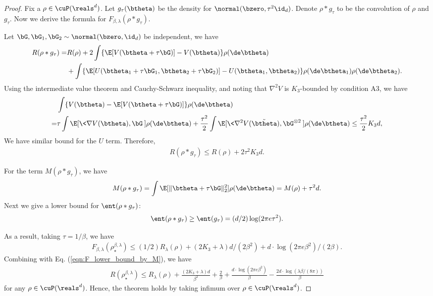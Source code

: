 \documentclass[11pt]{article}
\begin{document}
\begin{proof}

Fix a $\rho \in \cuP(\reals^d)$. Let $g_{\tau}(\btheta)$ be the density for $\normal(\bzero, \tau^2 \id_d)$. Denote $\rho * g_{\tau}$ to be the convolution of $\rho$ and $g_{\tau}$. Now we derive the formula for $F_{\beta, \lambda}(\rho * g_{\tau})$. 


Let $\bG, \bG_1, \bG_2 \sim \normal(\bzero, \id_d)$ be independent, we have
\[
\begin{aligned}
R(\rho * g_{\tau} ) =& R(\rho) + 2 \int \{ \E[V(\btheta + \tau \bG)] - V(\btheta) \} \rho(\de \btheta) \\
&+ \int \{\E[U(\btheta_1 + \tau \bG_1, \btheta_2 + \tau \bG_2)] - U(\btheta_1, \btheta_2)\} \rho(\de \btheta_1) \rho(\de \btheta_2).\\
\end{aligned}
\]
Using the intermediate value theorem and Cauchy-Schwarz inequality, and noting that $\nabla^2 V$ is $K_3$-bounded by condition {\sf A3}, we have
\[
\begin{aligned}
&\int \{V(\btheta) - \E[V(\btheta + \tau\bG)]\} \rho(\de \btheta) \\
=& \tau \int \E[\<\nabla V(\btheta), \bG\> ] \rho( \de \btheta) + \frac{\tau^2}{2} \int \E[\< \nabla^2 V(\tilde \btheta) , \bG^{\otimes 2}\> ] \rho(\de \btheta) \le \frac{\tau^2}{2} K_3 d,
\end{aligned}
\]
We have similar bound for the $U$ term. Therefore, 
\begin{align}
R(\rho * g_{\tau} ) \le R(\rho) + 2\tau^2 K_3 d. 
\end{align}

For the term $M(\rho * g_\tau)$, we have 
\begin{align}
M(\rho * g_\tau) = \int \E[\| \btheta + \tau \bG \|_2^2] \rho(\de \btheta) = M(\rho) + \tau^2 d. 
\end{align}
Next we give a lower bound for $\ent(\rho * g_\tau)$:
\begin{align}
\ent(\rho * g_\tau) \ge \ent(g_\tau) = (d/2) \log(2\pi e \tau^2). 
\end{align}



As a result, taking $\tau = 1/\beta$, we have 
\begin{align}
F_{\beta, \lambda}(\rho_\star^{\beta, \lambda}) \le (1/2) R_\lambda(\rho) + (2 K_3 + \lambda) d/(2\beta^2) + d\cdot \log( 2\pi e \beta^2) /(2\beta).
\end{align}
Combining with Eq. (\ref{eqn:F_lower_bound_by_M}), we have 
\begin{align}
R(\rho_\star^{\beta, \lambda}) \le R_\lambda(\rho)  + \frac{(2 K_3 + \lambda)d}{\beta^2} + \frac{2}{\beta} + \frac{d\cdot \log( 2\pi e \beta^2)}{\beta} - \frac{2 d \cdot \log (\lambda \beta/(8\pi))}{\beta}
\end{align}
for any $\rho \in \cuP(\reals^d)$. Hence, the theorem holds by taking infimum over $\rho \in \cuP(\reals^d)$. 
\end{proof}
\end{document}
